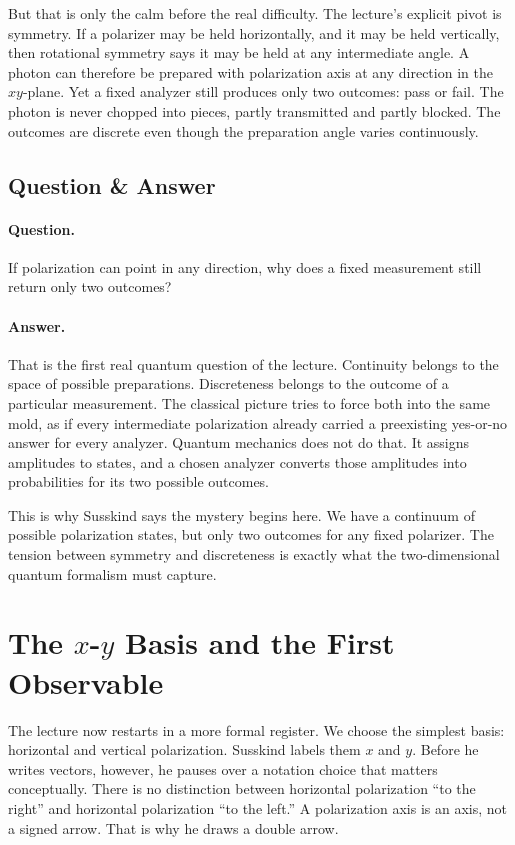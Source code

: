 But that is only the calm before the real difficulty. The lecture's explicit pivot is symmetry. If a polarizer may be held horizontally, and it may be held vertically, then rotational symmetry says it may be held at any intermediate angle. A photon can therefore be prepared with polarization axis at any direction in the \(xy\)-plane. Yet a fixed analyzer still produces only two outcomes: pass or fail. The photon is never chopped into pieces, partly transmitted and partly blocked. The outcomes are discrete even though the preparation angle varies continuously.

\subsection{Question \& Answer}

\paragraph{Question.}
If polarization can point in any direction, why does a fixed measurement still return only two outcomes?

\paragraph{Answer.}
That is the first real quantum question of the lecture. Continuity belongs to the space of possible preparations. Discreteness belongs to the outcome of a particular measurement. The classical picture tries to force both into the same mold, as if every intermediate polarization already carried a preexisting yes-or-no answer for every analyzer. Quantum mechanics does not do that. It assigns amplitudes to states, and a chosen analyzer converts those amplitudes into probabilities for its two possible outcomes.

This is why Susskind says the mystery begins here. We have a continuum of possible polarization states, but only two outcomes for any fixed polarizer. The tension between symmetry and discreteness is exactly what the two-dimensional quantum formalism must capture.

\section{The \(x\)-\(y\) Basis and the First Observable}

The lecture now restarts in a more formal register. We choose the simplest basis: horizontal and vertical polarization. Susskind labels them \(x\) and \(y\). Before he writes vectors, however, he pauses over a notation choice that matters conceptually. There is no distinction between horizontal polarization ``to the right'' and horizontal polarization ``to the left.'' A polarization axis is an axis, not a signed arrow. That is why he draws a double arrow.

